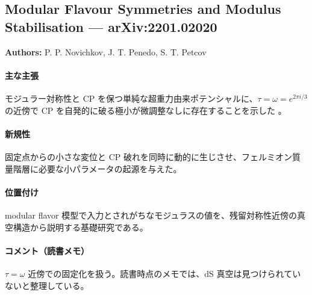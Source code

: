 \subsection{Modular Flavour Symmetries and Modulus Stabilisation --- arXiv:2201.02020}

\textbf{Authors:} P. P. Novichkov, J. T. Penedo, S. T. Petcov

\paragraph{主な主張}
モジュラー対称性と CP を保つ単純な超重力由来ポテンシャルに、$\tau=\omega=e^{2\pi i/3}$ の近傍で CP を自発的に破る極小が微調整なしに存在することを示した \cite{Novichkov:2022wvg}。

\paragraph{新規性}
固定点からの小さな変位と CP 破れを同時に動的に生じさせ、フェルミオン質量階層に必要な小パラメータの起源を与えた。

\paragraph{位置付け}
modular flavor 模型で入力とされがちなモジュラスの値を、残留対称性近傍の真空構造から説明する基礎研究である。

\paragraph{コメント（読書メモ）}
$\tau=\omega$ 近傍での固定化を扱う。読書時点のメモでは、dS 真空は見つけられていないと整理している。
